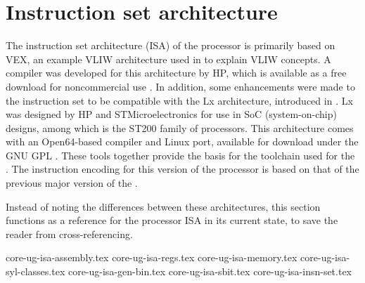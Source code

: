 
\clearpage
\section{Instruction set architecture}
\label{sec:core-ug-isa}

The instruction set architecture (ISA) of the \rvex{} processor is primarily 
based on VEX, an example VLIW architecture used in \cite{fisher2005} to explain 
VLIW concepts. A compiler was developed for this architecture by HP, which is 
available as a free download for noncommercial use \cite{hpvex}. In addition, some 
enhancements were made to the instruction set to be compatible with the Lx 
architecture, introduced in \cite{faraboschi2000}. Lx was designed by HP and 
STMicroelectronics for use in SoC (system-on-chip) designs, among which is the 
ST200 family of processors. This architecture comes with an Open64-based 
compiler and Linux port, available for download under the GNU GPL \cite{st200}. 
These tools together provide the basis for the toolchain used for the \rvex{}. 
The instruction encoding for this version of the \rvex{} processor is based on 
that of the previous major version of the \rvex{} \cite{seedorf2010}.

Instead of noting the differences between these architectures, this section 
functions as a reference for the \rvex{} processor ISA in its current state, to 
save the reader from cross-referencing.

{core-ug-isa-assembly.tex}
{core-ug-isa-regs.tex}
{core-ug-isa-memory.tex}
{core-ug-isa-syl-classes.tex}
{core-ug-isa-gen-bin.tex}
{core-ug-isa-sbit.tex}
{core-ug-isa-insn-set.tex}





